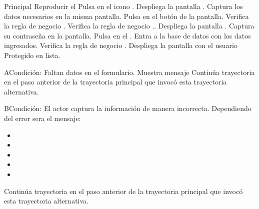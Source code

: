 	\begin{UCtrayectoria}{Principal}
		\UCpaso Reproducir el 
		\UCpaso[\UCactor] Pulsa en el icono .
		\UCpaso[\UCsist] Despliega la pantalla .
		\UCpaso[\UCactor] Captura los datos necesarios en la misma pantalla.
		\UCpaso[\UCactor] Pulsa en el botón  de la pantalla.
		\UCpaso[\UCsist] Verifica la regla de negocio . 
		\UCpaso[\UCsist] Verifica la regla de negocio .. 
		\UCpaso[\UCsist] Despliega la pantalla .
		\UCpaso[\UCactor] Captura su contraseña en la pantalla.
		\UCpaso[\UCactor] Pulsa en el  .
		\UCpaso[\UCsist] Entra a la base de datos con los datos ingresados.  
		\UCpaso[\UCsist] Verifica la regla de negocio . 
		\UCpaso[\UCsist] Despliega la pantalla  con el usuario Protegido en lista.
	\end{UCtrayectoria}
	\begin{UCtrayectoriaA}{A}{Condición: Faltan datos en el formulario.}
		\UCpaso[\UCsist] Muestra mensaje 
		\UCpaso[\UCsist] Continúa trayectoria en el paso anterior de la trayectoria  principal que invocó esta trayectoria alternativa. 
	\end{UCtrayectoriaA}
	\begin{UCtrayectoriaA}{B}{Condición: El actor captura la información de manera incorrecta.}
		\UCpaso[\UCsist] Dependiendo del error sera el mensaje:
			\begin{itemize}
			\item {}
			\item {}
			\item {}
			\item {}
			\item {}
			\end{itemize}
		\UCpaso[\UCsist] Continúa trayectoria en el paso anterior de la trayectoria principal que invocó esta trayectoria alternativa. 
	\end{UCtrayectoriaA}
